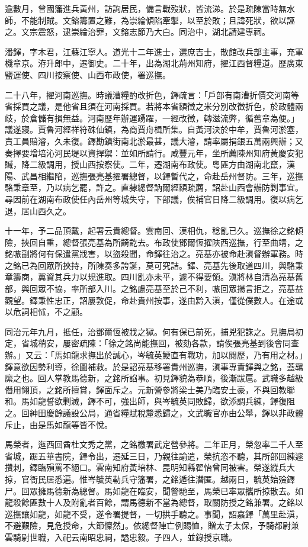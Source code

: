 \begin{pinyinscope}
逾數月，曾國籓進兵黃州，訪詢居民，備言戰歿狀，皆流涕。於是疏陳當時無水師，不能制賊。文鎔籌置之難，為崇綸傾陷牽掣，以至於敗；且諱死狀，欲以誣之。文宗震怒，逮崇綸治罪，文鎔志節乃大白。同治中，湖北請建專祠。

潘鐸，字木君，江蘇江寧人。道光十二年進士，選庶吉士，散館改兵部主事，充軍機章京。洊升郎中，遷御史。二十年，出為湖北荊州知府，擢江西督糧道。歷廣東鹽運使、四川按察使、山西布政使，署巡撫。

二十八年，擢河南巡撫。時議漕糧酌改折色，鐸疏言：「戶部有南漕折價交河南等省採買之議，是他省且須在河南採買。若將本省額徵之米分別改徵折色，於政體兩歧，於倉儲有損無益。河南歷年辦運踴躍，一經改徵，轉滋流弊，循舊章為便。」議遂寢。賈魯河經祥符硃仙鎮，為商賈舟楫所集。自黃河決於中牟，賈魯河淤塞，責工員賠濬，久未復。鐸勘鎮街南北淤最甚，議大濬，請率屬捐銀五萬兩興辦；又奏擇要增培沁河民堤以資捍禦：並如所請行。咸豐元年，坐所薦陳州知府黃慶安犯贓，降二級調用，授山西按察使。二年，遷湖南布政使。粵匪方由湖南北竄，漢陽、武昌相繼陷，巡撫張亮基擢署總督，以鐸暫代之，命赴岳州督防。三年，巡撫駱秉章至，乃以病乞罷，許之。直隸總督訥爾經額疏薦，詔赴山西會辦防剿事宜。尋因前在湖南布政使任內岳州等城失守，下部議，俟補官日降二級調用。復以病乞退，居山西久之。

十一年，予二品頂戴，起署云貴總督。雲南回、漢相仇，稔亂已久。巡撫徐之銘傾險，挾回自重，總督張亮基為所齮齕去。布政使鄧爾恆擢陜西巡撫，行至曲靖，之銘嗾副將何有保遣黨戕害，以盜殺聞，命鐸往治之。亮基亦被命赴滇督辦軍務。時之銘已為回眾所挾持，所陳奏多誇誕，莫可究詰。鐸、亮基先後取道四川，與駱秉章籌商，冀資其兵力以規進取。四川亂亦未平，遽不得要領。滇將林自清為亮基舊部，與回眾不協，率所部入川。之銘慮亮基至於己不利，嗾回眾揚言拒之，亮基益觀望。鐸秉性忠正，詔屢敦促，命赴貴州按事，遂由黔入滇，僅從僕數人。在途或以危詞相怵，不之顧。

同治元年九月，抵任，治鄧爾恆被戕之獄。何有保已前死，捕兇犯誅之。見撫局初定，省城稍安，屢密疏陳：「徐之銘尚能撫回，被劾各款，請俟張亮基到後會同查辦。」又云：「馬如龍求撫出於誠心，岑毓英鯁直有戰功，加以閱歷，乃有用之材。」鐸意欲因勢利導，徐圖補救。於是詔亮基移署貴州巡撫，滇事專責鐸與之銘，蓋羈縻之也。回人掌教馬德新，之銘所諂事。初見鐸貌為恭順，後漸跋扈。武職多越級僭用翎頂，之銘所擅賞，鐸面斥之。元新營參將梁士美乃臨安土豪，不與回教聯和。馬如龍誓欲剿滅，鐸不可，強出師，與岑毓英同敗歸，欲添調兵練，鐸復阻之。回紳田慶餘議設公局，通省糧賦稅釐悉歸之，文武職官亦由公舉，鐸以非政體斥止，由是馬如龍等皆不悅。

馬榮者，迤西回酋杜文秀之黨，之銘檄署武定營參將。二年正月，榮忽率二千人至省城，踞五華書院，鐸令出，遷延三日，乃親往諭遣，榮抗恣不聽，其所部回練遽攢刺，鐸臨殞罵不絕口。雲南知府黃培林、昆明知縣翟怡曾同被害。榮遂縱兵大掠，官衙民居悉遍。惟岑毓英勒兵守籓署，之銘遁往潛匿。越兩日，毓英始殮鐸尸。回眾擁馬德新為總督。馬如龍在臨安，聞警馳至，馬榮已率眾攜所掠散去。如龍殺餘匪數十人及附亂者百餘，謂馬德新不當為總督，取關防授之銘兼署。之銘以巡撫讓如龍，如龍不受，遂令署提督，一切拱手聽之。事聞，詔嘉鐸「萬里赴滇，不避艱險，見危授命，大節懍然」。依總督陣亡例賜恤，贈太子太保，予騎都尉兼雲騎尉世職，入祀云南昭忠祠，謚忠毅。子四人，並錄授京職。


\end{pinyinscope}
